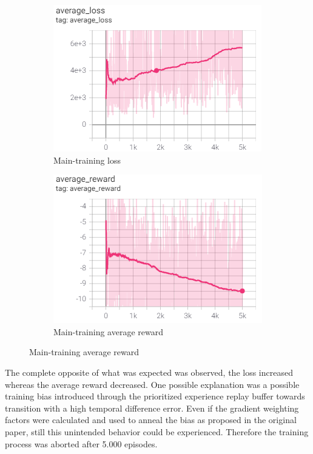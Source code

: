 \begin{figure}[ht]
	\centering
	\begin{subfigure}[b]{0.49\textwidth}
		\centering
		\includegraphics[width=\textwidth]{figures/training1-main-loss-smooth.PNG}
		\caption{Main-training loss}
		\label{fig:main-loss-smoothed-1}
	\end{subfigure}
	\hfill
	\begin{subfigure}[b]{0.49\textwidth}
		\centering
		\includegraphics[width=\textwidth]{figures/training1-main-reward-smooth.PNG}
		\caption{Main-training average reward}
		\label{fig:main-reward-smoothed-1}
	\end{subfigure}
\end{figure}

The complete opposite of what was expected was observed, the loss increased whereas the average reward decreased. One possible explanation was a possible training bias introduced through the prioritized experience replay buffer towards transition with a high temporal difference error. Even if the gradient weighting factors were calculated and used to anneal the bias as proposed in the original paper, still this unintended behavior could be experienced. Therefore the training process was aborted after 5.000 episodes. 

